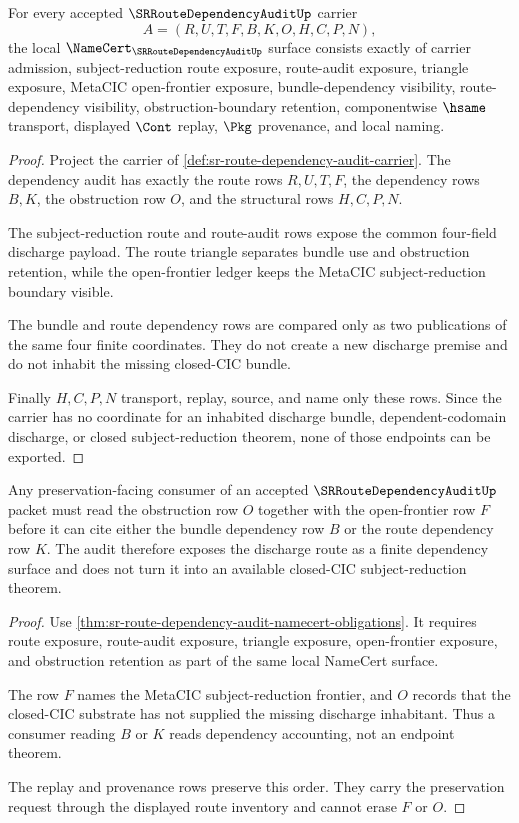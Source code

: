 \begin{theorem}
\label{thm:sr-route-dependency-audit-namecert-obligations}
For every accepted $\SRRouteDependencyAuditUp$ carrier
$$
A=(R,U,T,F,B,K,O,H,C,P,N),
$$
the local $\NameCert_{\SRRouteDependencyAuditUp}$ surface consists exactly of carrier admission, subject-reduction route exposure, route-audit exposure, triangle exposure, MetaCIC open-frontier exposure, bundle-dependency visibility, route-dependency visibility, obstruction-boundary retention, componentwise $\hsame$ transport, displayed $\Cont$ replay, $\Pkg$ provenance, and local naming.
\end{theorem}
\begin{proof}
Project the carrier of \autoref{def:sr-route-dependency-audit-carrier}. The dependency audit has exactly the route rows $R,U,T,F$, the dependency rows $B,K$, the obstruction row $O$, and the structural rows $H,C,P,N$.

The subject-reduction route and route-audit rows expose the common four-field discharge payload. The route triangle separates bundle use and obstruction retention, while the open-frontier ledger keeps the MetaCIC subject-reduction boundary visible.

The bundle and route dependency rows are compared only as two publications of the same four finite coordinates. They do not create a new discharge premise and do not inhabit the missing closed-CIC bundle.

Finally $H,C,P,N$ transport, replay, source, and name only these rows. Since the carrier has no coordinate for an inhabited discharge bundle, dependent-codomain discharge, or closed subject-reduction theorem, none of those endpoints can be exported.
\end{proof}

\begin{theorem}
\label{thm:sr-route-dependency-audit-obstruction-nonescape}
Any preservation-facing consumer of an accepted $\SRRouteDependencyAuditUp$ packet must read the obstruction row $O$ together with the open-frontier row $F$ before it can cite either the bundle dependency row $B$ or the route dependency row $K$. The audit therefore exposes the discharge route as a finite dependency surface and does not turn it into an available closed-CIC subject-reduction theorem.
\end{theorem}
\begin{proof}
Use \autoref{thm:sr-route-dependency-audit-namecert-obligations}. It requires route exposure, route-audit exposure, triangle exposure, open-frontier exposure, and obstruction retention as part of the same local NameCert surface.

The row $F$ names the MetaCIC subject-reduction frontier, and $O$ records that the closed-CIC substrate has not supplied the missing discharge inhabitant. Thus a consumer reading $B$ or $K$ reads dependency accounting, not an endpoint theorem.

The replay and provenance rows preserve this order. They carry the preservation request through the displayed route inventory and cannot erase $F$ or $O$.
\end{proof}

